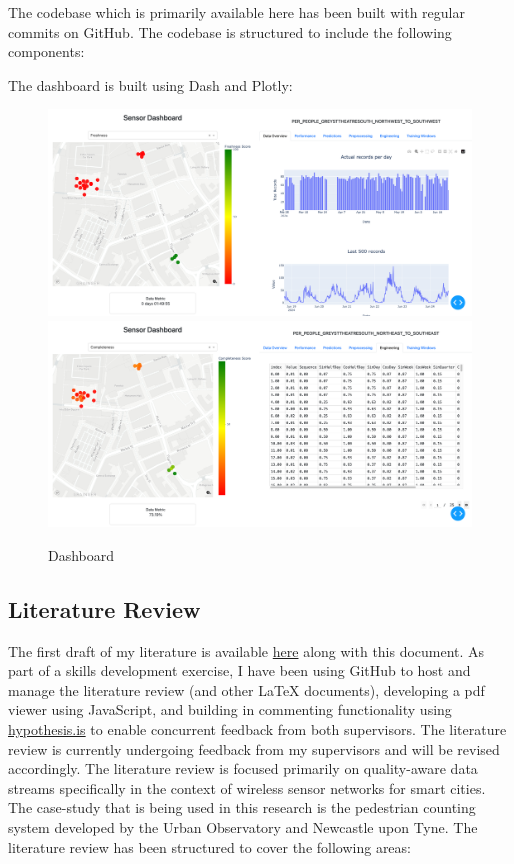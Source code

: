 The codebase which is primarily available here has been built with regular commits on GitHub. The codebase is structured to include the following components:



The dashboard is built using Dash and Plotly:

\begin{figure}[ht]
    \centering
    \includegraphics[scale=0.25]{figures/sensor_map_a.png}
    \includegraphics[scale=0.25]{figures/sensor_map_b.png}
    \caption{Dashboard}
    \label{fig:dashboard}
\end{figure}

\subsection{Literature Review}

The first draft of my literature is available \href{https://carrowmw.github.io/latex-documents/}{here} along with this document. As part of a skills development exercise, I have been using GitHub to host and manage the literature review (and other \LaTeX{} documents), developing a pdf viewer using JavaScript, and building in commenting functionality using \href{https://web.hypothes.is/}{hypothesis.is} to enable concurrent feedback from both supervisors. The literature review is currently undergoing feedback from my supervisors and will be revised accordingly. The literature review is focused primarily on quality-aware data streams specifically in the context of wireless sensor networks for smart cities. The case-study that is being used in this research is the pedestrian counting system developed by the Urban Observatory and Newcastle upon Tyne. The literature review has been structured to cover the following areas:

